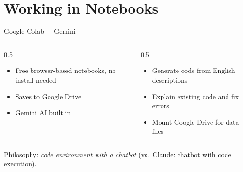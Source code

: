 \documentclass[aspectratio=169]{beamer}
\begin{document}
\section{Working in Notebooks}

\begin{frame}{Google Colab + Gemini}
\begin{columns}[T]
\begin{column}{0.5\textwidth}
\begin{shadedbox}[title=\textbf{What is Colab?}]
\begin{itemize}\small
  \item Free browser-based notebooks, no install needed
  \item Saves to Google Drive
  \item Gemini AI built in
\end{itemize}
\end{shadedbox}
\end{column}
\begin{column}{0.5\textwidth}
\begin{shadedbox}[title=\textbf{How Gemini Helps}]
\begin{itemize}\small
  \item Generate code from English descriptions
  \item Explain existing code and fix errors
  \item Mount Google Drive for data files
\end{itemize}
\end{shadedbox}
\end{column}
\end{columns}
\vspace{0.3cm}
Philosophy: \textit{code environment with a chatbot} (vs.\ Claude: chatbot with code execution).
\end{frame}
\end{document}
